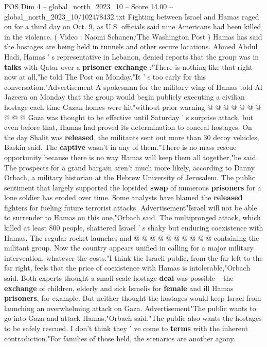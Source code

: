 \begin{textsample}{POS Dim 4 – global\_north\_2023\_10 – Score 14.00 – global\_north\_2023\_10/102478432.txt}
Fighting between Israel and Hamas raged on for a third day on Oct. 9, as U.S. officials said nine Americans had been killed in the violence. ( Video : Naomi Schanen/The Washington Post ) Hamas has said the hostages are being held in tunnels and other secure locations.
Ahmed Abdul Hadi, Hamas ' s representative in Lebanon, denied reports that the group was in \textbf{talks} with Qatar over a \textbf{prisoner} \textbf{exchange} :"There is nothing like that right now at all,"he told The Post on Monday."It ' s too early for this conversation."Advertisement A spokesman for the military wing of Hamas told Al Jazeera on Monday that the group would begin publicly executing a civilian hostage each time Gazan homes were hit"without prior warning @ @ @ @ @ @ @ @ @ @ Gaza was thought to be effective until Saturday ' s surprise attack, but even before that, Hamas had proved its determination to conceal hostages.
On the day Shalit was \textbf{released}, the militants sent out more than 30 decoy vehicles, Baskin said.
The \textbf{captive} wasn't in any of them."There is no mass rescue opportunity because there is no way Hamas will keep them all together,"he said.
The prospects for a grand bargain aren't much more likely, according to Danny Orbach, a military historian at the Hebrew University of Jerusalem.
The public sentiment that largely supported the lopsided \textbf{swap} of numerous \textbf{prisoners} for a lone soldier has eroded over time.
Some analysts have blamed the \textbf{released} fighters for fueling future terrorist attacks.
Advertisement"Israel will not be able to surrender to Hamas on this one,"Orbach said.
The multipronged attack, which killed at least 800 people, shattered Israel ' s shaky but enduring coexistence with Hamas.
The regular rocket launches and @ @ @ @ @ @ @ @ @ @ containing the militant group.
Now the country appears unified in calling for a major military intervention, whatever the costs."I think the Israeli public, from the far left to the far right, feels that the price of coexistence with Hamas is intolerable,"Orbach said.
Both experts thought a small-scale hostage \textbf{deal} was possible -- the \textbf{exchange} of children, elderly and sick Israelis for \textbf{female} and ill Hamas \textbf{prisoners}, for example.
But neither thought the hostages would keep Israel from launching an overwhelming attack on Gaza.
Advertisement"The public wants to go into Gaza and attack Hamas,"Orbach said."The public also wants the hostages to be safely rescued.
I don't think they ' ve come to \textbf{terms} with the inherent contradiction."For families of those held, the scenarios are another agony.

\end{textsample}
